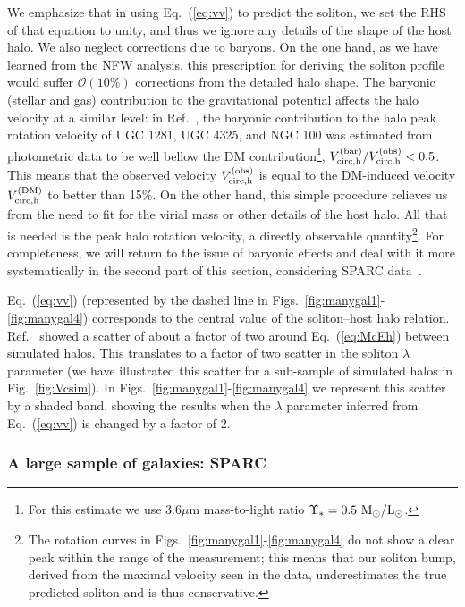 \documentclass[aps,prd,floats,superscriptaddress,showpacs,nofootinbib,twocolumn,preprintnumbers]{revtex4-1}%
\begin{document}
We emphasize that in using Eq.~(\ref{eq:vv}) to predict the soliton,
we set the RHS of that equation to unity, and thus we ignore any
details of the shape of the host halo. We also neglect corrections due to baryons. 
%
On the one hand, as we have learned from the NFW
analysis, this prescription for deriving the soliton profile would
suffer $\mathcal{O}(10\%)$ corrections from the detailed halo shape. 
The baryonic (stellar and gas) contribution to the gravitational potential affects the halo velocity at a similar level: in Ref.~\cite{Lelli:2016zqa}, the baryonic contribution to the halo peak rotation velocity of UGC 1281, UGC 4325, and NGC 100 was estimated from photometric data  to be well bellow the DM contribution\footnote{For this estimate we use 3.6$\mu$m mass-to-light ratio $\Upsilon_*=0.5~{\rm M_\odot/L_\odot}$.}, $V_{\rm circ,h}^{(\rm bar)}/V_{\rm circ,h}^{(\rm obs)}<0.5$. This means that the observed velocity $V_{\rm circ,h}^{(\rm obs)}$ is equal to the DM-induced velocity $V_{\rm circ,h}^{(\rm DM)}$ to better than 15\%.
%
On the other hand, this simple procedure relieves us from the need to fit for the virial mass or  other details of the host halo. All that is needed is the peak halo 
rotation velocity, a directly observable quantity\footnote{\label{fn}The
  rotation curves in Figs.~\ref{fig:manygal1}-\ref{fig:manygal4} do
  not show a clear peak within the range of the measurement; this
  means that our soliton bump, derived from the maximal velocity 
  seen in the data, underestimates the true predicted soliton and is
  thus conservative.}. For completeness, we will return to the issue of baryonic effects and deal with it more systematically in the second part of this section, considering SPARC data~\cite{Lelli:2016zqa}. 


%
Eq.~(\ref{eq:vv}) (represented by the dashed line in
Figs.~\ref{fig:manygal1}-\ref{fig:manygal4}) corresponds to the central value
of the soliton--host halo
relation. Ref.~\cite{Schive:2014hza,Schive:2014dra} showed a scatter
of about a factor of two around Eq.~(\ref{eq:McEh}) between
simulated halos. This translates to a factor of two scatter in the
soliton $\lambda$ parameter (we have illustrated this scatter for a sub-sample of simulated halos in Fig.~\ref{fig:Vcsim}).  
%
In Figs.~\ref{fig:manygal1}-\ref{fig:manygal4} we represent this
 scatter by a shaded band, showing the results
when the $\lambda$ parameter inferred from Eq.~(\ref{eq:vv}) is
changed by a factor of 2. 
%

\subsubsection{A large sample of galaxies: SPARC}\label{sssec:many}
%
\end{document}
